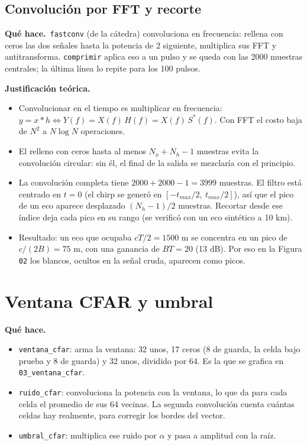 \documentclass[11pt]{article}
\newcommand{\codigo}[2]{}
\newcommand{\teoria}{\par\textcolor{verde}{\textbf{Justificación teórica.}}\ }
\newcommand{\hace}{\par\textcolor{verde}{\textbf{Qué hace.}}\ }
\newcommand{\archivo}[1]{\texttt{#1}}
\begin{document}
\subsection{Convolución por FFT y recorte}
\codigo{25}{32}
\codigo{92}{99}
\hace \archivo{fastconv} (de la cátedra) convoluciona en frecuencia: rellena con ceros las dos señales hasta la potencia de 2 siguiente, multiplica sus FFT y antitransforma. \archivo{comprimir} aplica eso a un pulso y se queda con las 2000 muestras centrales; la última línea lo repite para los 100 pulsos.

\teoria
\begin{itemize}
  \item Convolucionar en el tiempo es multiplicar en frecuencia: $y = x * h \Leftrightarrow Y(f) = X(f)\,H(f) = X(f)\,S^*(f)$. Con FFT el costo baja de $N^2$ a $N\log N$ operaciones.
  \item El relleno con ceros hasta al menos $N_x + N_h - 1$ muestras evita la convolución circular: sin él, el final de la salida se mezclaría con el principio.
  \item La convolución completa tiene $2000 + 2000 - 1 = 3999$ muestras. El filtro está centrado en $t = 0$ (el chirp se generó en $[-t_{max}/2,\ t_{max}/2]$), así que el pico de un eco aparece desplazado $(N_h - 1)/2$ muestras. Recortar desde ese índice deja cada pico en su rango (se verificó con un eco sintético a 10 km).
  \item Resultado: un eco que ocupaba $cT/2 = 1500$ m se concentra en un pico de $c/(2B) = 75$ m, con una ganancia de $BT = 20$ (13 dB). Por eso en la Figura \archivo{02} los blancos, ocultos en la señal cruda, aparecen como picos.
\end{itemize}

\section{Ventana CFAR y umbral}
\label{sec:cfar}
\codigo{104}{122}
\hace
\begin{itemize}
  \item \archivo{ventana\_cfar}: arma la ventana: 32 unos, 17 ceros (8 de guarda, la celda bajo prueba y 8 de guarda) y 32 unos, dividido por 64. Es la que se grafica en \archivo{03\_ventana\_cfar}.
  \item \archivo{ruido\_cfar}: convoluciona la potencia con la ventana, lo que da para cada celda el promedio de sus 64 vecinas. La segunda convolución cuenta cuántas celdas hay realmente, para corregir los bordes del vector.
  \item \archivo{umbral\_cfar}: multiplica ese ruido por $\alpha$ y pasa a amplitud con la raíz.
\end{itemize}
\end{document}
